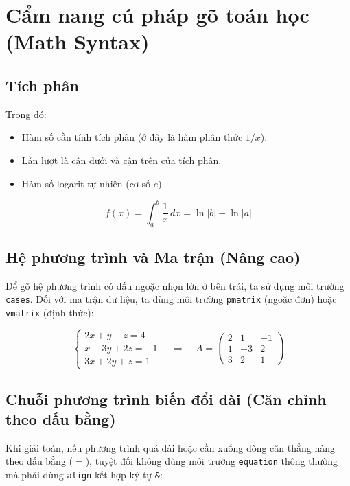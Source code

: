 \documentclass{article}
\begin{document}
\section{Cẩm nang cú pháp gõ toán học (Math Syntax)}\label{section:toanhoc}


\subsection{Tích phân}
Trong đó:
\begin{itemize}
    \item[$f(x)$:] Hàm số cần tính tích phân (ở đây là hàm phân thức $1/x$).
    \item[$a, b$:] Lần lượt là cận dưới và cận trên của tích phân.
    \item[$\ln$:] Hàm số logarit tự nhiên (cơ số $e$).
\end{itemize}
\begin{equation}
    \label{eq:tichphan}
    f(x) = \int_{a}^{b} \frac{1}{x} \,dx = \ln|b| - \ln|a|
\end{equation}

\subsection{Hệ phương trình và Ma trận (Nâng cao)}
Để gõ hệ phương trình có dấu ngoặc nhọn lớn ở bên trái, ta sử dụng môi trường \texttt{cases}. Đối với ma trận dữ liệu, ta dùng môi trường \texttt{pmatrix} (ngoặc đơn) hoặc \texttt{vmatrix} (định thức):

\begin{equation}
    \begin{cases}
        2x + y - z = 4 \\
        x - 3y + 2z = -1 \\
        3x + 2y + z = 1
    \end{cases}
    \quad \Rightarrow \quad
    A = \begin{pmatrix}
        2 & 1 & -1 \\
        1 & -3 & 2 \\
        3 & 2 & 1
    \end{pmatrix}
\end{equation}

\subsection{Chuỗi phương trình biến đổi dài (Căn chỉnh theo dấu bằng)}
Khi giải toán, nếu phương trình quá dài hoặc cần xuống dòng căn thẳng hàng theo dấu bằng ($=$), tuyệt đối không dùng môi trường \texttt{equation} thông thường mà phải dùng \texttt{align} kết hợp ký tự \texttt{\&}:
\end{document}
